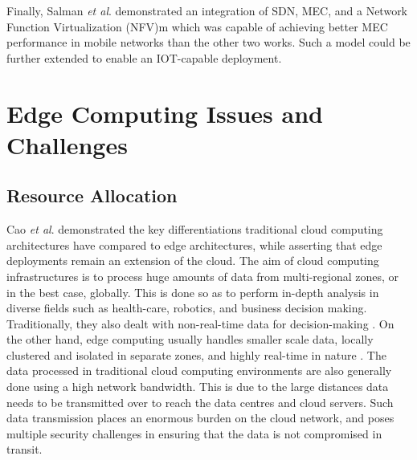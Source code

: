 Finally, Salman \textit{et al}. \cite{salman2015edge} demonstrated an integration of SDN, MEC, and a Network Function Virtualization (NFV)m which was capable of achieving better MEC performance in mobile networks than the other two works. Such a model could be further extended to enable an IOT-capable deployment.\par

\section{Edge Computing Issues and Challenges}
\label{sec:ch3-edge-issues}

\subsection{Resource Allocation}
\label{subsec:ch3-edge-resource-alloc}

Cao \textit{et al}. \cite{cao2020overview} demonstrated the key differentiations traditional cloud computing architectures have compared to edge architectures, while asserting that edge deployments remain an extension of the cloud. The aim of cloud computing infrastructures is to process huge amounts of data from multi-regional zones, or in the best case, globally. This is done so as to perform in-depth analysis in diverse fields such as health-care, robotics, and business decision making. Traditionally, they also dealt with non-real-time data for decision-making \cite{premsankar2018edge}. On the other hand, edge computing usually handles smaller scale data, locally clustered and isolated in separate zones, and highly real-time in nature \cite{mishra2020early}. The data processed in traditional cloud computing environments are also generally done using a high network bandwidth. This is due to the large distances data needs to be transmitted over to reach the data centres and cloud servers. Such data transmission places an enormous burden on the cloud network, and poses multiple security challenges in ensuring that the data is not compromised in transit.\par


